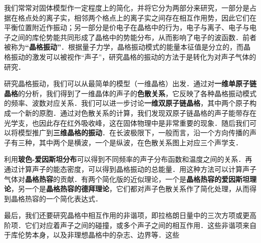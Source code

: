 
我们常常对固体模型作一定程度上的简化，并将它分为两部分来研究，一部分是占据在格点处的离子实，相邻两个格点上的离子实之间存在相互作用势，因此它们在平衡位置附近作振动；另一部分是价电子在晶格中的行为，电子与离子、电子与电子之间的库伦势能共同形成了晶格中的势能分布，从而影响了电子的波函数．前者被称为\textbf{“晶格振动”}．根据量子力学，晶格振动模式的能量本征值是分立的，而晶格振动的激发可以被视作“声子”，研究晶格的振动的方法于是转化为对声子气体的研究．

研究晶格振动，我们可以从最简单的模型（一维晶格）出发．通过对\textbf{一维单原子链晶格}的分析，我们得到了一维晶体的声子的\textbf{色散关系}，它反映了各种晶格振动模式的频率、波数对应关系．我们可以进一步讨论\textbf{一维双原子链晶格}，其中两个原子构成一个新的原胞．通过对色散关系的计算，我们发现双原子链晶格的声子能带存在光学支，也因此存在红外吸收峰，这在固体物理中是非常重要的现象．随后我们可以将模型推广到\textbf{三维晶格的振动}．在长波极限下，一般而言，沿一个方向传播的声子有三种，其中两个是横波，一个是纵波，在色散关系图上对应三个声学支．

利用\textbf{玻色-爱因斯坦分布}可以得到不同频率的声子分布函数和温度之间的关系．再通过计算声子的能态密度，可以得到晶格振动的总能量．用这种方法可以计算声子气体对\textbf{晶格热容}的贡献．有两个简化版的近似理论，一个是\textbf{晶格热容的爱因斯坦理论}，另一个是\textbf{晶格热容的德拜理论}，它们都对声子色散关系作了简化处理，从而得到晶格热容的一个简化表达式．

最后，我们还要研究晶格中相互作用的非谐项，即拉格朗日量中的三次方项或更高阶项．它们对应着声子之间的碰撞，或多个声子之间的相互作用．这些非谐项来自于库伦势本身，以及非理想晶格中的杂志、边界等．这些
